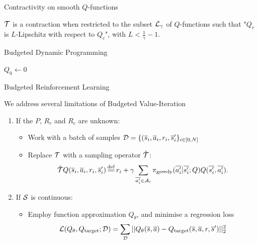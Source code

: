 \documentclass{beamer}
\begin{document}
    \begin{frame}{Contractivity on smooth $Q$-functions}
        \begin{conjecture}
            $\mathcal{T}$ is a contraction when restricted to the subset $\mathcal{L}_\gamma$ of $Q$-functions such that "$Q_r$ is $L$-Lipschitz with respect to $Q_c$", with $L<\frac{1}{\gamma}-1$.
        \end{conjecture}

    \end{frame}

    \begin{frame}{Budgeted Dynamic Programming}
        \begin{algorithm}[H]
            \DontPrintSemicolon
            $Q_{0} \leftarrow 0$\;
            \caption{Budgeted Value-Iteration}
        \end{algorithm}
    \end{frame}


    \begin{frame}{Budgeted Reinforcement Learning}

        We address several limitations of Budgeted Value-Iteration

        \begin{enumerate}
            \pause\item If the $P$, $R_r$ and $R_c$ are unknown:
            \begin{itemize}
                \pause\item Work with a {batch} of samples $\mathcal{D}=\{(\overline{s}_i,\overline{a}_i,r_i,\overline{s}_i'\}_{i\in [0,N]}$
                \pause\item Replace $\mathcal{T}$ with a sampling operator $\hat{\mathcal{T}}$:
                \begin{equation*}
                    \hat{\cT} Q(\os_i, \oa_i, r_i, \os'_i) \eqdef r_i + \gamma \sum_{\ov{a'_i}\in \cA_i} \pi_\text{greedy}(\ov{a'_i}|\ov{s'_i}; Q) Q(\ov{s'_i}, \ov{a'_i}).
                \end{equation*}
            \end{itemize}
            \pause\item If $\mathcal{S}$ is continuous:
            \begin{itemize}
                \pause\item Employ function approximation $Q_\theta$, and minimise a regression loss
                $$\mathcal{L}(Q_\theta, Q_\text{target};\mathcal{D}) = \sum_{\mathcal{D}} ||Q_\theta(\overline{s}, \overline{a}) - Q_\text{target}(\overline{s}, \overline{a}, r, \overline{s}')||_2^2$$
            \end{itemize}

        \end{enumerate}

    \end{frame}
\end{document}
